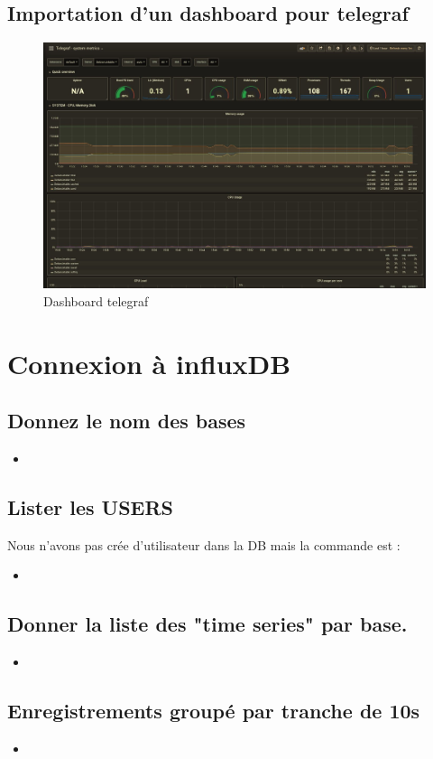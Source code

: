 \documentclass[10pt,a4paper]{article}
\newcommand{\insertcode}[2]{\begin{itemize}\item[]\end{itemize}}
\begin{document}
\subsection{Importation d’un dashboard pour telegraf}
  \begin{figure}[h!]
\centering
\includegraphics[scale=0.30]{screen/telegraf.jpg}
\caption{Dashboard telegraf}
\label{fig:qos}
\end{figure}





\newpage
\section{Connexion à influxDB}

\subsection{Donnez le nom des bases}
\insertcode{commande/11.txt}{Liste des Tables}

 \subsection{Lister les USERS }
 Nous n'avons pas crée d'utilisateur dans la DB mais la commande est :
 \insertcode{commande/12.txt}{Liste USERS}
 
 \subsection{Donner la liste des "time series" par base.}
 \insertcode{commande/13.txt}{SHOW SERIES}
 
 \newpage
 \subsection{Enregistrements groupé par tranche de 10s }
 \insertcode{commande/14.txt}{GROUPE BY}
\end{document}
